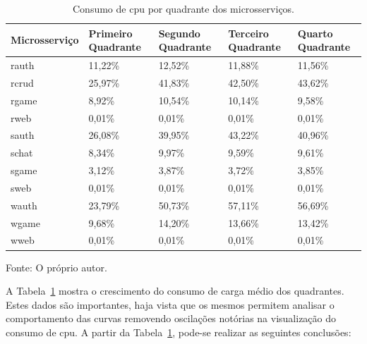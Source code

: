 \begin{table}[htb!]
\centering
\begin{adjustbox}{max width=\textwidth}
\caption{Consumo de \ac{cpu} por quadrante dos microsserviços.}
\label{tab:cpu_microsservicos_media_quadrantes}

\begin{tabular}{l|l|l|l|l}
\hline \hline
Microsserviço & Primeiro Quadrante & Segundo Quadrante & Terceiro Quadrante & Quarto Quadrante \\ \hline \hline
rauth         & 11,22\%            & 12,52\%           & 11,88\%            & 11,56\%          \\ \hline
rcrud         & 25,97\%            & 41,83\%           & 42,50\%             & 43,62\%          \\ \hline
rgame         & 8,92\%             & 10,54\%           & 10,14\%            & 9,58\%           \\ \hline
rweb          & 0,01\%             & 0,01\%            & 0,01\%             & 0,01\%           \\ \hline
sauth         & 26,08\%            & 39,95\%           & 43,22\%            & 40,96\%          \\ \hline
schat         & 8,34\%             & 9,97\%            & 9,59\%             & 9,61\%           \\ \hline
sgame         & 3,12\%             & 3,87\%            & 3,72\%             & 3,85\%           \\ \hline
sweb          & 0,01\%             & 0,01\%            & 0,01\%             & 0,01\%           \\ \hline
wauth         & 23,79\%            & 50,73\%           & 57,11\%            & 56,69\%          \\ \hline
wgame         & 9,68\%             & 14,20\%           & 13,66\%            & 13,42\%          \\ \hline
wweb          & 0,01\%             & 0,01\%            & 0,01\%             & 0,01\%           \\ \hline \hline
\end{tabular}
\end{adjustbox}

Fonte: O próprio autor.
\end{table}

A Tabela~\ref{tab:cpu_microsservicos_media_quadrantes} mostra o crescimento do consumo de carga médio dos quadrantes.
%
Estes dados são importantes, haja vista que os mesmos permitem analisar o comportamento das curvas removendo oscilações notórias na visualização do consumo de \ac{cpu}.
%
A partir da Tabela~\ref{tab:cpu_microsservicos_media_quadrantes}, pode-se realizar as seguintes conclusões:

